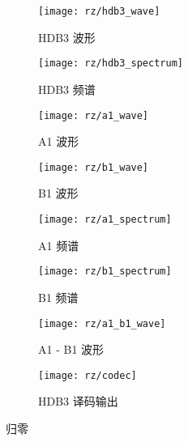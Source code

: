 \documentclass[../main]{subfiles}
\begin{document}
\begin{figure}[htbp]
  \centering
  \begin{subfigure}[htbp]{0.45\linewidth}
    \centering
    \texttt{[image: rz/hdb3\_wave]}
    \caption{HDB3 波形}%
    \label{fig:rz/hdb3_wave}
  \end{subfigure}
  \quad
  \begin{subfigure}[htbp]{0.45\linewidth}
    \centering
    \texttt{[image: rz/hdb3\_spectrum]}
    \caption{HDB3 频谱}%
    \label{fig:rz/hdb3_spectrum}
  \end{subfigure}

  \begin{subfigure}[htbp]{0.45\linewidth}
    \centering
    \texttt{[image: rz/a1\_wave]}
    \caption{A1 波形}%
    \label{fig:rz/a1_wave}
  \end{subfigure}
  \quad
  \begin{subfigure}[htbp]{0.45\linewidth}
    \centering
    \texttt{[image: rz/b1\_wave]}
    \caption{B1 波形}%
    \label{fig:rz/b1_wave}
  \end{subfigure}

  \begin{subfigure}[htbp]{0.45\linewidth}
    \centering
    \texttt{[image: rz/a1\_spectrum]}
    \caption{A1 频谱}%
    \label{fig:rz/a1_spectrum}
  \end{subfigure}
  \quad
  \begin{subfigure}[htbp]{0.45\linewidth}
    \centering
    \texttt{[image: rz/b1\_spectrum]}
    \caption{B1 频谱}%
    \label{fig:rz/b1_spectrum}
  \end{subfigure}

  \begin{subfigure}[htbp]{0.45\linewidth}
    \centering
    \texttt{[image: rz/a1\_b1\_wave]}
    \caption{A1 - B1 波形}%
    \label{fig:rz/a1_b1_wave}
  \end{subfigure}
  \quad
  \begin{subfigure}[htbp]{0.45\linewidth}
    \centering
    \texttt{[image: rz/codec]}
    \caption{HDB3 译码输出}%
    \label{fig:rz/codec}
  \end{subfigure}
  \caption{归零}%
  \label{fig:rz}
\end{figure}
\end{document}
